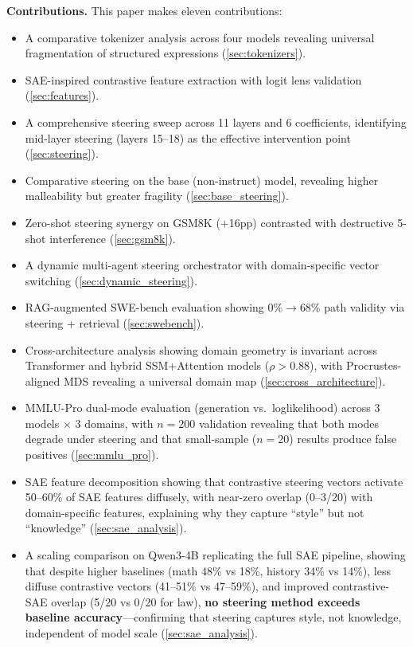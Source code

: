 \documentclass[11pt,a4paper]{article}
\begin{document}
\textbf{Contributions.} This paper makes eleven contributions:
\begin{itemize}
    \item A comparative tokenizer analysis across four models revealing universal fragmentation of structured expressions (\cref{sec:tokenizers}).
    \item SAE-inspired contrastive feature extraction with logit lens validation (\cref{sec:features}).
    \item A comprehensive steering sweep across 11 layers and 6 coefficients, identifying mid-layer steering (layers 15--18) as the effective intervention point (\cref{sec:steering}).
    \item Comparative steering on the base (non-instruct) model, revealing higher malleability but greater fragility (\cref{sec:base_steering}).
    \item Zero-shot steering synergy on GSM8K ($+$16pp) contrasted with destructive 5-shot interference (\cref{sec:gsm8k}).
    \item A dynamic multi-agent steering orchestrator with domain-specific vector switching (\cref{sec:dynamic_steering}).
    \item RAG-augmented SWE-bench evaluation showing 0\%$\to$68\% path validity via steering + retrieval (\cref{sec:swebench}).
    \item Cross-architecture analysis showing domain geometry is invariant across Transformer and hybrid SSM+Attention models ($\rho > 0.88$), with Procrustes-aligned MDS revealing a universal domain map (\cref{sec:cross_architecture}).
    \item MMLU-Pro dual-mode evaluation (generation vs.\ loglikelihood) across 3 models $\times$ 3 domains, with $n=200$ validation revealing that both modes degrade under steering and that small-sample ($n=20$) results produce false positives (\cref{sec:mmlu_pro}).
    \item SAE feature decomposition showing that contrastive steering vectors activate 50--60\% of SAE features diffusely, with near-zero overlap (0--3/20) with domain-specific features, explaining why they capture ``style'' but not ``knowledge'' (\cref{sec:sae_analysis}).
    \item A scaling comparison on Qwen3-4B replicating the full SAE pipeline, showing that despite higher baselines (math 48\% vs 18\%, history 34\% vs 14\%), less diffuse contrastive vectors (41--51\% vs 47--59\%), and improved contrastive-SAE overlap (5/20 vs 0/20 for law), \textbf{no steering method exceeds baseline accuracy}---confirming that steering captures style, not knowledge, independent of model scale (\cref{sec:sae_analysis}).

\end{itemize}
\end{document}
